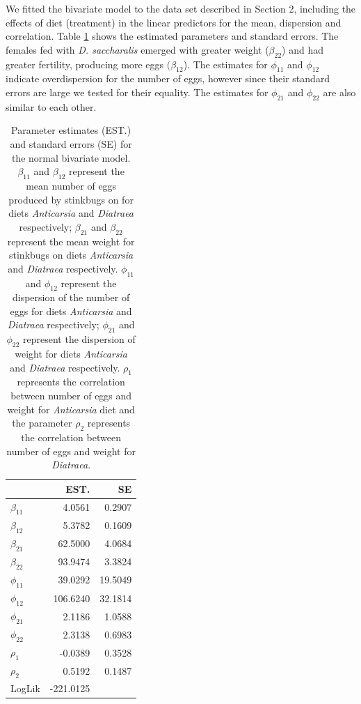 \documentclass[useAMS,referee]{biom}
\begin{document}
We fitted the bivariate model to the data set described in Section 2, including the effects of diet (treatment) in the linear predictors for the mean, dispersion and correlation. Table \ref{table0} shows the estimated parameters and standard errors. The females fed with \textit{D. saccharalis} emerged with greater weight ($\beta_{22}$) and had greater fertility, producing more eggs $(\beta_{12}$). The estimates for $\phi_{11}$ and $\phi_{12}$ indicate overdispersion for the number of eggs,  however since their standard errors are large we tested for their equality. The estimates for $\phi_{21}$ and $\phi_{22}$ are also similar to each other.

\begin{table}[h]
\footnotesize
\caption{Parameter estimates (EST.) and standard errors (SE) for
the normal bivariate model. $\beta_{11}$ and $\beta_{12}$ represent the mean number of eggs produced by stinkbugs on for diets \textit{Anticarsia} and \textit{Diatraea} respectively; $\beta_{21}$ and $\beta_{22}$ represent the mean weight for stinkbugs on diets \textit{Anticarsia} and \textit{Diatraea} respectively. $\phi_{11}$ and $\phi_{12}$ represent the dispersion of the number of eggs for diets \textit{Anticarsia} and \textit{Diatraea} respectively; $\phi_{21}$ and $\phi_{22}$ represent the dispersion of weight for diets \textit{Anticarsia} and \textit{Diatraea} respectively. $\rho_1$ represents the correlation between number of eggs and weight for \textit{Anticarsia} diet and the parameter $\rho_2$ represents the correlation between number of eggs and weight for \textit{Diatraea}.}
\label{table0}
\begin{center}
\begin{tabular}{lrr}
	\hline
	&EST. & SE \\ \hline
	$\beta_{11}$ & 4.0561 & 0.2907 \\ 
	$\beta_{12}$ &  5.3782 & 0.1609 \\
	
	$\beta_{21}$& 62.5000 & 4.0684  \\
	
	$\beta_{22}$& 93.9474 & 3.3824\\
	
	$\phi_{11}$& 39.0292 & 19.5049 \\ 
	$\phi_{12}$&  106.6240  & 32.1814\\
	$\phi_{21}$&  2.1186 & 1.0588  \\ 
	$\phi_{22}$& 2.3138 &0.6983\\
	$\rho_1$ & -0.0389 & 0.3528 \\
	
	$\rho_2$& 0.5192 & 0.1487\\
	\hline
	LogLik & -221.0125 & \\
	\hline
\end{tabular}
\end{center}
\end{table}
\end{document}
